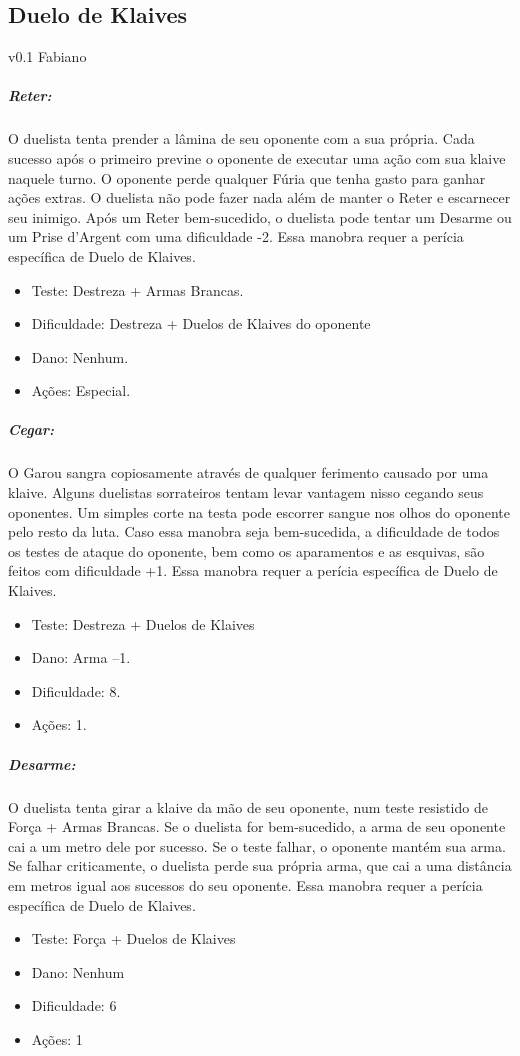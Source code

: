 \begin{center}
\section{\LARGE \bf Duelo de Klaives}
v0.1 Fabiano
\end{center}

\subparagraph{\bf Reter:} O duelista tenta prender a lâmina de seu oponente com a sua própria. Cada sucesso após o primeiro previne o oponente de executar uma ação com sua klaive naquele turno. O oponente perde qualquer Fúria que tenha gasto para ganhar ações extras. O duelista não pode fazer nada além de manter o Reter e escarnecer seu inimigo. Após um Reter bem-sucedido, o duelista pode tentar um Desarme ou um Prise d'Argent com uma dificuldade -2. Essa manobra requer a perícia específica de Duelo de Klaives. 
\begin{itemize}[noitemsep]
\item Teste: Destreza + Armas Brancas.
\item Dificuldade: Destreza + Duelos de Klaives do oponente
\item Dano: Nenhum.
\item Ações: Especial.
\end{itemize}

\subparagraph{\bf Cegar:} O Garou sangra copiosamente através de qualquer ferimento causado por uma klaive. Alguns duelistas sorrateiros tentam levar vantagem nisso cegando seus oponentes. Um simples corte na testa pode escorrer sangue nos olhos do oponente pelo resto da luta. Caso essa manobra seja bem-sucedida, a dificuldade de todos os testes de ataque do oponente, bem como os aparamentos e as esquivas, são feitos com dificuldade +1. Essa manobra requer a perícia específica de Duelo de Klaives.
\begin{itemize}[noitemsep]
\item Teste: Destreza + Duelos de Klaives
\item Dano: Arma –1.
\item Dificuldade: 8.
\item Ações: 1.
\end{itemize}

\subparagraph{\bf Desarme:} O duelista tenta girar a klaive da mão de seu oponente, num teste resistido de Força + Armas Brancas. Se o duelista for bem-sucedido, a arma de seu oponente cai a um metro dele por sucesso. Se o teste falhar, o oponente mantém sua arma. Se falhar criticamente, o duelista perde sua própria arma, que cai a uma distância em metros igual aos sucessos do seu oponente. Essa manobra requer a perícia específica de Duelo de Klaives.
\begin{itemize}[noitemsep]
\item Teste: Força + Duelos de Klaives
\item Dano: Nenhum
\item Dificuldade: 6 
\item Ações: 1
\end{itemize}

